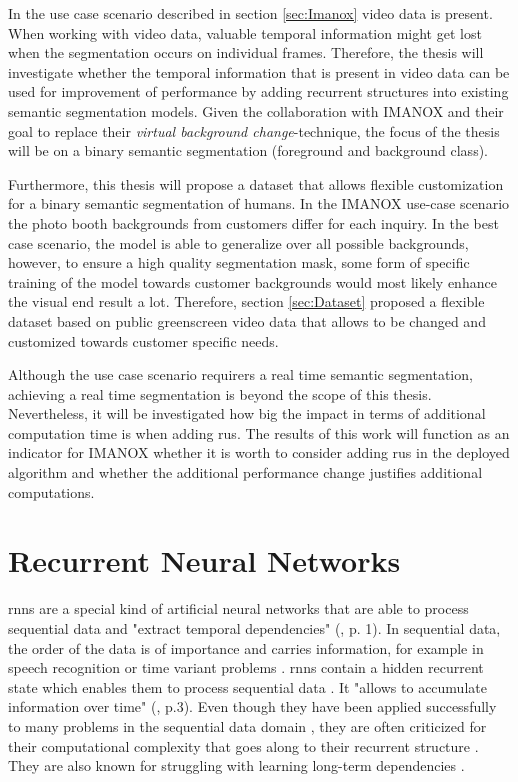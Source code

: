 \documentclass[11pt,
  paper=a4, 
  bibliography=totocnumbered,
	captions=tableheading,
	BCOR=10mm
]{scrreprt}
\theoremstyle{definition}
\begin{document}
In the use case scenario described in section \ref{sec:Imanox} video data is present.
When working with video data, valuable temporal information might get lost when the segmentation occurs on individual frames.
Therefore, the thesis will investigate whether the temporal information that is present in video data can be used for improvement of performance by adding recurrent structures
into existing semantic segmentation models. 
Given the collaboration with IMANOX and their goal to replace their \textit{virtual background change}-technique, the focus of the thesis will be on a binary semantic segmentation (foreground and background class).

Furthermore, this thesis will propose a dataset that allows flexible customization for a binary semantic segmentation of humans.
In the IMANOX use-case scenario the photo booth backgrounds from customers differ for each inquiry.
In the best case scenario, the model is able to generalize over all possible backgrounds, however, to ensure a high quality segmentation mask, some form of specific training of the model towards customer backgrounds would most likely enhance the visual end result a lot.
Therefore, section \ref{sec:Dataset} proposed a flexible dataset based on public greenscreen video data that allows to be changed and customized towards customer specific needs.

Although the use case scenario requirers a real time semantic segmentation, achieving a real time segmentation is beyond the scope of this thesis.
Nevertheless, it will be investigated how big the impact in terms of additional computation time is when adding \glspl{ru}.
The results of this work will function as an indicator for IMANOX whether it is worth to consider adding \glspl{ru} in the deployed algorithm and whether the additional performance change justifies additional computations. 


\section{Recurrent Neural Networks} \label{ch:RNN}

\glspl{rnn} are a special kind of artificial neural networks that are able to process sequential data \cite{Valipour2017, Sherstinsky2020} and "extract temporal dependencies" (\cite{Hochreiter1998}, p. 1).
In sequential data, the order of the data is of importance and carries information, for example in speech recognition or time variant problems \cite{Hoffmann2017, Pfeuffer2_2019}.
\glspl{rnn} contain a hidden recurrent state which enables them to process sequential data \cite{Hoffmann2017, Valipour2017}.
It "allows to accumulate information over time" (\cite{Tokmakov2017}, p.3).
Even though they have been applied successfully to many problems in the sequential data domain \cite{Sherstinsky2020}, they are often criticized for their computational complexity that goes along to their recurrent structure \cite{Pfeuffer2_2019}.
They are also known for struggling with learning long-term dependencies \cite{Hoffmann2017}.
\end{document}
